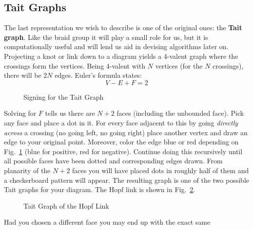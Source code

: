    \subsection{Tait Graphs}
        The last representation we wish to describe is one of the original
        ones: the \textbf{Tait graph}. Like the braid group it will play a
        small role for us, but it is computationally useful and will lend
        us aid in devising algorithms later on. Projecting a knot or link down
        to a diagram yields a 4-valent graph where the crossings form the
        vertices. Being 4-valent with $N$ vertices (for the $N$ crossings),
        there will be $2N$ edges. Euler's formula states:
        \begin{equation}
            V-E+F=2
        \end{equation}
        \begin{figure}
            \centering
            \caption{Signing for the Tait Graph}
            \label{fig:tait_graph_signs}
        \end{figure}
        Solving for $F$ tells us there are $N+2$ faces (including the unbounded
        face). Pick any face and place a dot in it.
        For every face adjacent to this by going \textit{directly across} a
        crossing (no going left, no going right) place another vertex and
        draw an edge to your original point. Moreover, color the edge blue or
        red depending on Fig.~\ref{fig:tait_graph_signs}
        (blue for positive, red for
        negative). Continue doing this recursively until all possible faces
        have been dotted and corresponding edges drawn. From planarity of the
        $N+2$ faces you will have placed dots in roughly half of them and a
        checkerboard pattern will appear. The resulting graph is one of the
        two possible Tait graphs for your diagram. The Hopf link is shown in
        Fig.~\ref{fig:hopf_link_tait_graph_002}.
        \begin{figure}
            \centering
            \caption{Tait Graph of the Hopf Link}
            \label{fig:hopf_link_tait_graph_002}
        \end{figure}
        \par\hfill\par
        Had you chosen a different face you may end up with the exact same
